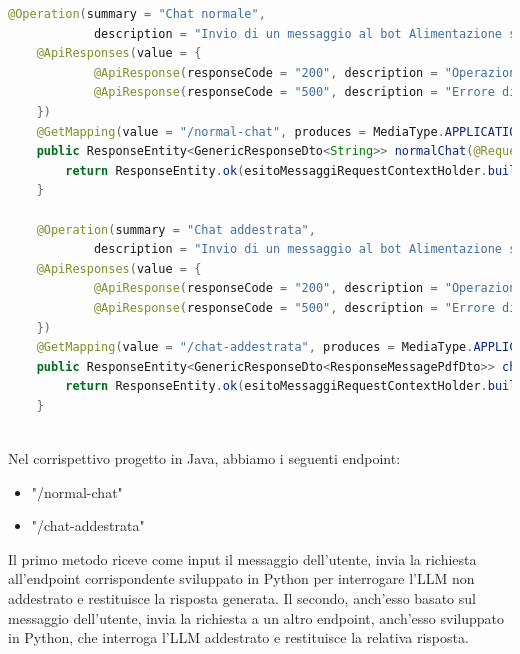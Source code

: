 \documentclass[a4paper,twoside,12pt]{toptesi}
\begin{document}
\begin{lstlisting}[language=Java, caption=Microservizio Java]
@Operation(summary = "Chat normale",
            description = "Invio di un messaggio al bot Alimentazione sfruttando l'LLM non addestrato")
    @ApiResponses(value = {
            @ApiResponse(responseCode = "200", description = "Operazione andata a buon fine"),
            @ApiResponse(responseCode = "500", description = "Errore di sistema")
    })
    @GetMapping(value = "/normal-chat", produces = MediaType.APPLICATION_JSON_VALUE)
    public ResponseEntity<GenericResponseDto<String>> normalChat(@RequestParam String messagge) {
        return ResponseEntity.ok(esitoMessaggiRequestContextHolder.buildGenericResponse(chatService.normalChat(messagge)));
    }

    @Operation(summary = "Chat addestrata",
            description = "Invio di un messaggio al bot Alimentazione sfruttando l'LLM addestrato")
    @ApiResponses(value = {
            @ApiResponse(responseCode = "200", description = "Operazione andata a buon fine"),
            @ApiResponse(responseCode = "500", description = "Errore di sistema")
    })
    @GetMapping(value = "/chat-addestrata", produces = MediaType.APPLICATION_JSON_VALUE)
    public ResponseEntity<GenericResponseDto<ResponseMessagePdfDto>> chatAddestrata(@RequestParam String messagge) {
        return ResponseEntity.ok(esitoMessaggiRequestContextHolder.buildGenericResponse(chatService.chatAddestrata(messagge)));
    }
        
\end{lstlisting}

Nel corrispettivo progetto in Java, abbiamo i seguenti endpoint:
\begin{itemize}
\item "/normal-chat"
\item "/chat-addestrata"
\end{itemize}

Il primo metodo riceve come input il messaggio dell'utente, invia la richiesta all'endpoint corrispondente sviluppato in Python per interrogare l'LLM non addestrato e restituisce la risposta generata. Il secondo, anch'esso basato sul messaggio dell'utente, invia la richiesta a un altro endpoint, anch'esso sviluppato in Python, che interroga l'LLM addestrato e restituisce la relativa risposta.

  


\end{document}
